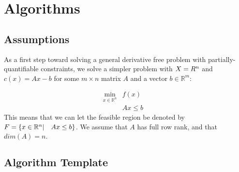 

\section{Algorithms}

\subsection{Assumptions}
% 
% 
% 
% 


As a first step toward solving a general derivative free problem with partially-quantifiable constraints,
we solve a simpler problem with $X = R^n$ and $c(x) = Ax-b$ for some $m\times n$ matrix $A$ and a vector $b\in \mathbb R^m$:

\[ \begin{array}{ccl} \min_{x \in \mathbb R^n} & f(x) \\
& Ax \le b & 
\end{array}
\]
This means that we can let the feasible region be denoted by ${F} = \{x \in \mathbb R^n | \quad  Ax \le b \}$.
We assume that $A$ has full row rank, and that  $dim(A) = n$.

\subsection{Algorithm Template}


